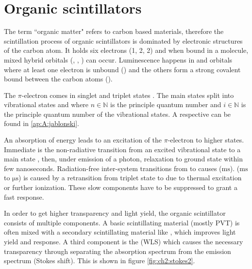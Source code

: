 \section{Organic scintillators}
The term ``organic matter" refers to carbon based materials, therefore the scintillation process of organic scintillators is dominated by electronic structures of the carbon atom. It holds six electrons (1, 2, 2) and when bound in a molecule, mixed hybrid orbitals (, , ) can occur. Luminescence happens in  and  orbitals where at least one electron is unbound () and the others form a strong covalent bound between the carbon atoms (). \par 
The $\pi$-electron comes in singlet  and triplet states . The main states split into vibrational states  and  where $n\in\mathbb{N}$ is the principle quantum number and $i\in\mathbb{N}$ is the principle quantum number of the vibrational states. A respective   can be found in \ref{ap:A:jablonski}. \par 
An absorption of energy leads to an excitation of the $\pi$-electron to higher states. Immediate  is the non-radiative transition from an excited vibrational state  to a main state , then, under emission of a photon, relaxation to ground state  within few nanoseconds. Radiation-free inter-system transitions from  to  causes  ($\si{\milli\second}$).  ($\si{\milli\second}$ to $\si{\micro\second}$) is caused by a retransition from triplet state  to  due to thermal excitation or further ionization. These slow components have to be suppressed to grant a fast response. \par 
In order to get higher transparency and light yield, the organic scintillator consists of multiple components. A basic scintillating material (mostly  PVT) is often mixed with a secondary scintillating material like , which improves light yield and response. A third component is the  (WLS) which causes the necessary transparency through separating the absorption spectrum from the emission spectrum (Stokes shift). This is shown in figure \ref{fig:ch2:stokes2}. \par 
